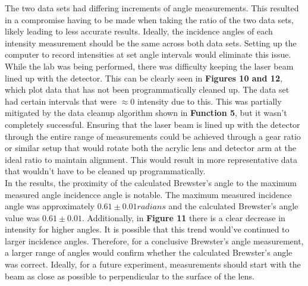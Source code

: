 \documentclass[
	letterpaper, %
	10pt, %
]{CSUniSchoolLabReport}
\begin{document}
The two data sets had differing increments of angle measurements. This resulted in a compromise having to be
made when taking the ratio of the two data sets, likely leading to less accurate results. Ideally, the
incidence angles of each intensity measurement should be the same across both data sets. Setting up the
computer to record intensities at set angle intervals would eliminate this issue.\\

While the lab was being performed, there was difficulty keeping the laser beam lined up with the detector.
This can be clearly seen in \textbf{Figures 10 and 12}, which plot data that has not been programmatically cleaned up.
The data set had certain intervals that were $\approx 0$ intensity due to this. This was partially
mitigated by the data cleanup algorithm shown in \textbf{Function 5}, but it wasn't completely successful.
Ensuring that the laser beam is lined up with the detector through the entire range of measurements
could be achieved through a gear ratio or similar setup that would rotate both the acrylic lens and detector
arm at the ideal ratio to maintain alignment. This would result in more representative data that
wouldn't have to be cleaned up programmatically.\\

In the results, the proximity of the calculated Brewster's angle to the maximum measured angle
incidencce angle is notable. The maximum measured incidence angle was approximately $0.61\pm0.01 radians$
and the calculated Brewster's angle value was $0.61\pm0.01$. Additionally, in \textbf{Figure 11} there is a
clear decrease in intensity for higher angles. It is possible that this trend would've continued to larger
incidence angles. Therefore, for a conclusive Brewster's angle measurement, a larger range of angles would
confirm whether the calculated Brewster's angle was correct. Ideally, for a future experiment, measurements
should start with the beam as close as possible to perpendicular to the surface of the lens.\\
\end{document}
